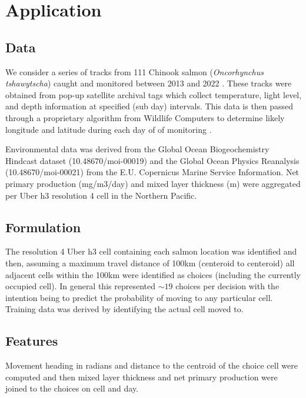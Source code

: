 \documentclass[11pt]{article}
\begin{document}
\section*{Application}

\subsection*{Data}

We consider a series of tracks from 111 Chinook salmon (\textit{Oncorhynchus tshawytscha}) caught and monitored between 2013 and 2022 \citep{tags1} \citep{tags2}. These tracks were obtained from pop-up satellite archival tags which collect temperature, light level, and depth information at specified (sub day) intervals. This data is then passed through a proprietary algorithm from Wildlife Computers to determine likely longitude and latitude during each day of of monitoring \citep{PSAT}. \newline

Environmental data was derived from the Global Ocean Biogeochemistry Hindcast dataset (10.48670/moi-00019) and the Global Ocean Physics Reanalysis (10.48670/moi-00021) from the E.U. Copernicus Marine Service Information. Net primary production (mg/m3/day) and mixed layer thickness (m) were aggregated per Uber h3 resolution 4 cell in the Northern Pacific. 

\subsection*{Formulation}

The resolution 4 Uber h3 cell containing each salmon location was identified and then, assuming a maximum travel distance of 100km (centeroid to centeroid) all adjacent cells within the 100km were identified as choices (including the currently occupied cell). In general this represented $\sim 19$ choices per decision with the intention being to predict the probability of moving to any particular cell. Training data was derived by identifying the actual cell moved to. 

\subsection*{Features} 

Movement heading in radians and distance to the centroid of the choice cell were computed and then mixed layer thickness and net primary production were joined to the choices on cell and day.
\end{document}
